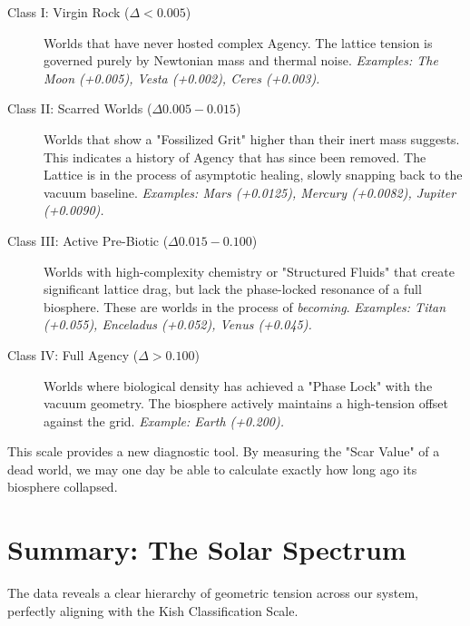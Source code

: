 \documentclass[11pt, letterpaper, openany]{book}
\begin{document}
\begin{description}
    \item[Class I: Virgin Rock ($\Delta < 0.005$)] 
    Worlds that have never hosted complex Agency. The lattice tension is governed purely by Newtonian mass and thermal noise.
    \textit{Examples: The Moon (+0.005), Vesta (+0.002), Ceres (+0.003).}

    \item[Class II: Scarred Worlds ($\Delta 0.005 - 0.015$)]
    Worlds that show a "Fossilized Grit" higher than their inert mass suggests. This indicates a history of Agency that has since been removed. The Lattice is in the process of asymptotic healing, slowly snapping back to the vacuum baseline.
    \textit{Examples: Mars (+0.0125), Mercury (+0.0082), Jupiter (+0.0090).}

    \item[Class III: Active Pre-Biotic ($\Delta 0.015 - 0.100$)]
    Worlds with high-complexity chemistry or "Structured Fluids" that create significant lattice drag, but lack the phase-locked resonance of a full biosphere. These are worlds in the process of \textit{becoming}.
    \textit{Examples: Titan (+0.055), Enceladus (+0.052), Venus (+0.045).}

    \item[Class IV: Full Agency ($\Delta > 0.100$)]
    Worlds where biological density has achieved a "Phase Lock" with the vacuum geometry. The biosphere actively maintains a high-tension offset against the grid.
    \textit{Example: Earth (+0.200).}
\end{description}

This scale provides a new diagnostic tool. By measuring the "Scar Value" of a dead world, we may one day be able to calculate exactly how long ago its biosphere collapsed.

\section{Summary: The Solar Spectrum}
The data reveals a clear hierarchy of geometric tension across our system, perfectly aligning with the Kish Classification Scale.
\end{document}
